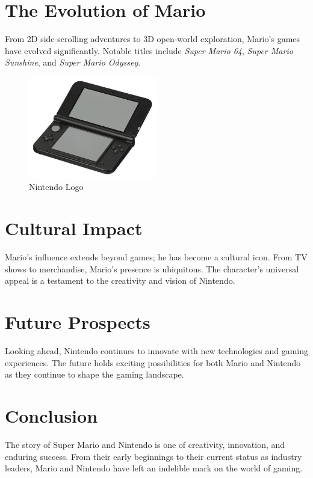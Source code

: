 \documentclass{article}
\begin{document}
\section{The Evolution of Mario}

From 2D side-scrolling adventures to 3D open-world exploration, Mario's games have evolved significantly. Notable titles include \textit{Super Mario 64}, \textit{Super Mario Sunshine}, and \textit{Super Mario Odyssey}\cite{marioGames}.

\begin{figure}[h]
\centering
\includegraphics[width=0.5\textwidth]{nintendo_logo.png}
\caption{Nintendo Logo}
\label{fig:nintendo-logo}
\end{figure}

\section{Cultural Impact}

Mario's influence extends beyond games; he has become a cultural icon. From TV shows to merchandise, Mario's presence is ubiquitous\cite{marioCulturalImpact}. The character's universal appeal is a testament to the creativity and vision of Nintendo.

\section{Future Prospects}

Looking ahead, Nintendo continues to innovate with new technologies and gaming experiences. The future holds exciting possibilities for both Mario and Nintendo as they continue to shape the gaming landscape\cite{nintendoFuture}.

\section{Conclusion}

The story of Super Mario and Nintendo is one of creativity, innovation, and enduring success. From their early beginnings to their current status as industry leaders, Mario and Nintendo have left an indelible mark on the world of gaming\cite{marioLegacy}.

\printbibliography
\end{document}
